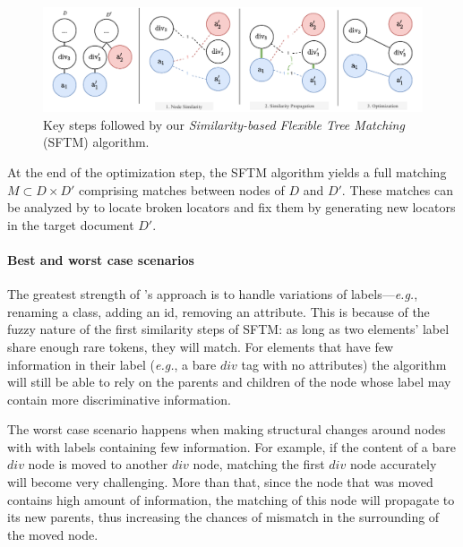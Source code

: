 \begin{figure}[!t]
    \centering
    \includegraphics[width=\linewidth]{erratum/explanations/sftm}
    \caption{Key steps followed by our \emph{Similarity-based Flexible Tree Matching} (SFTM) algorithm.}
    \label{fig:steps_sftm}
\end{figure}

At the end of the optimization step, the SFTM algorithm yields a full matching $M \subset D \times D' $ comprising matches between nodes of $D$ and $D'$.
These matches can be analyzed by \erratum{} to locate broken locators and fix them by generating new locators in the target document $D'$.

\paragraph{Best and worst case scenarios}
The greatest strength of \erratum's approach is to handle variations of labels---\emph{e.g.}, renaming a class, adding an id, removing an attribute.
This is because of the fuzzy nature of the first similarity steps of SFTM: as
long as two elements' label share enough rare tokens, they will match.
For elements that have few information in their label (\emph{e.g.}, a bare $div$ tag with no attributes) the algorithm will still be able to rely on the parents and children of the node whose label may contain more discriminative information.

The worst case scenario happens when making structural changes around nodes with with labels containing few information.
For example, if the content of a bare $div$ node is moved to another $div$ node,
matching the first $div$ node accurately will become very challenging.
More than that, since the node that was moved contains high amount of information, the matching of this node will propagate to its new parents, thus increasing the chances of mismatch in the surrounding of the moved node.


